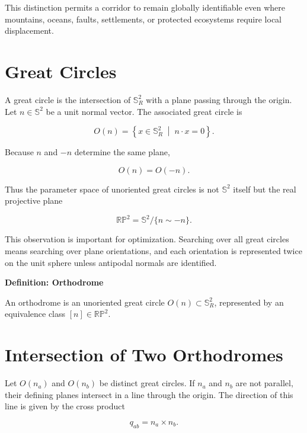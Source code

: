 \documentclass[11pt,fleqn]{book}
\numberwithin{equation}{chapter}
\newenvironment{definition}[1]
  {\begin{definitionEnv}
   \noindent\textbf{Definition: #1}\par\smallskip}
  {\end{definitionEnv}}
\theoremstyle{plain}
\theoremstyle{definition}
\theoremstyle{remark}
\newcommand{\Sphere}{\mathbb{S}^{2}}
\newcommand{\suchthat}{\;\middle|\;}
\begin{document}
This distinction permits a corridor to remain globally identifiable even where mountains, oceans, faults, settlements, or protected ecosystems require local displacement.

\section{Great Circles}

A great circle is the intersection of \(\Sphere_R\) with a plane passing through the origin. Let \(n\in\Sphere\) be a unit normal vector. The associated great circle is

\begin{equation}
    O(n)
    =
    \left\{
    x\in\Sphere_R
    \suchthat
    n\cdot x=0
    \right\}.
\end{equation}

Because \(n\) and \(-n\) determine the same plane,

\begin{equation}
    O(n)=O(-n).
\end{equation}

Thus the parameter space of unoriented great circles is not \(\Sphere\) itself but the real projective plane

\begin{equation}
    \mathbb{RP}^{2}
    =
    \Sphere/\{n\sim -n\}.
\end{equation}

This observation is important for optimization. Searching over all great circles means searching over plane orientations, and each orientation is represented twice on the unit sphere unless antipodal normals are identified.

\begin{definition}{Orthodrome}
An orthodrome is an unoriented great circle \(O(n)\subset\Sphere_R\), represented by an equivalence class \([n]\in\mathbb{RP}^{2}\).
\end{definition}

\section{Intersection of Two Orthodromes}

Let \(O(n_a)\) and \(O(n_b)\) be distinct great circles. If \(n_a\) and \(n_b\) are not parallel, their defining planes intersect in a line through the origin. The direction of this line is given by the cross product

\begin{equation}
    q_{ab}
    =
    n_a\times n_b.
\end{equation}
\end{document}
